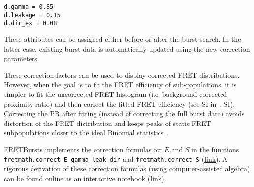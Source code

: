 \begin{lstlisting}
d.gamma = 0.85
d.leakage = 0.15
d.dir_ex = 0.08
\end{lstlisting}

These attributes can be assigned either before or after the burst search. In the
latter case, existing burst data is automatically updated using the new
correction parameters.

These correction factors can be used to display corrected FRET distributions.
However, when the goal is to fit the FRET efficiency of sub-populations, 
it is simpler to fit the uncorrected FRET histogram (i.e. background-corrected
proximity ratio) and then correct the fitted FRET efficiency (see SI in~\cite{Lee_2005}, SI).
Correcting the PR after fitting (instead of correcting the full burst data) 
avoids distortion of the FRET distribution and keeps peaks of
static FRET subpopulations closer to the ideal Binomial statistics~\cite{Gopich_2007}.

FRETBursts implements the correction formulas for $E$ and $S$ in the functions
\verb|fretmath.correct_E_gamma_leak_dir| and \verb|fretmath.correct_S|
(\href{http://fretbursts.readthedocs.org/en/latest/fretmath.html}{link}). 
A rigorous derivation of these correction formulas (using computer-assisted algebra) 
can be found online as an interactive notebook (\href{http://nbviewer.jupyter.org/github/tritemio/notebooks/blob/master/Derivation%20of%20FRET%20and%20S%20correction%20formulas.ipynb}{link}).
